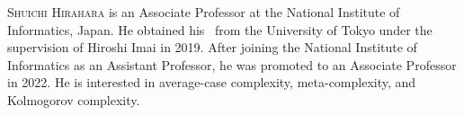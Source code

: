 \documentclass{toc}
\begin{document}
%
%
%
%
%
%
%
%
%
%
%
%
%
%
%
%
%
%
%
%
\begin{tocaboutauthors}
  \begin{tocabout}[hirahara]  %
    \textsc{Shuichi Hirahara}
    is an Associate Professor at
    the  %
    National Institute of Informatics, Japan.
    He obtained his \phd\ from the University of Tokyo under the supervision of Hiroshi Imai in 2019.
    After joining
    the  %
    National Institute of Informatics as an Assistant Professor,
    he was promoted to an Associate Professor in 2022.
    He is interested in average-case complexity, meta-complexity, and Kolmogorov complexity.
  \end{tocabout}
\end{tocaboutauthors}
\end{document}
